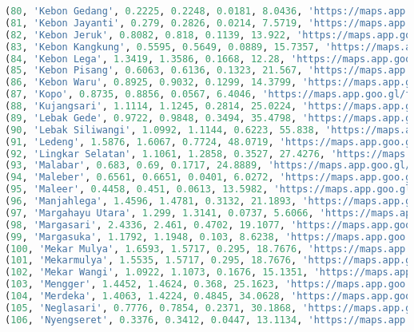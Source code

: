 \begin{lstlisting}[language=SQL]
(80, 'Kebon Gedang', 0.2225, 0.2248, 0.0181, 8.0436, 'https://maps.app.goo.gl/T7Pp2V7doJ4uaTRy8'),
(81, 'Kebon Jayanti', 0.279, 0.2826, 0.0214, 7.5719, 'https://maps.app.goo.gl/KCw53NEcF9yq2qxGA'),
(82, 'Kebon Jeruk', 0.8082, 0.818, 0.1139, 13.922, 'https://maps.app.goo.gl/nn4zm4juMAaCpMEn7'),
(83, 'Kebon Kangkung', 0.5595, 0.5649, 0.0889, 15.7357, 'https://maps.app.goo.gl/TFQZojC3aJFHotxr7'),
(84, 'Kebon Lega', 1.3419, 1.3586, 0.1668, 12.28, 'https://maps.app.goo.gl/oNBmV2wdeuiK2jAL9'),
(85, 'Kebon Pisang', 0.6063, 0.6136, 0.1323, 21.567, 'https://maps.app.goo.gl/nvx8rJGck5E8mMjUA'),
(86, 'Kebon Waru', 0.8925, 0.9032, 0.1299, 14.3799, 'https://maps.app.goo.gl/n9EkDgcQz7Xy5E599'),
(87, 'Kopo', 0.8735, 0.8856, 0.0567, 6.4046, 'https://maps.app.goo.gl/fP8WmgbTW8GKpzW6A'),
(88, 'Kujangsari', 1.1114, 1.1245, 0.2814, 25.0224, 'https://maps.app.goo.gl/y5QFj8kbNrtQqFUM6'),
(89, 'Lebak Gede', 0.9722, 0.9848, 0.3494, 35.4798, 'https://maps.app.goo.gl/rueZbwVUPT4JTsoY6'),
(90, 'Lebak Siliwangi', 1.0992, 1.1144, 0.6223, 55.838, 'https://maps.app.goo.gl/AGdn5PXbSb1Lk8Ar6'),
(91, 'Ledeng', 1.5876, 1.6067, 0.7724, 48.0719, 'https://maps.app.goo.gl/NVPkfJx5te4TDS3g7'),
(92, 'Lingkar Selatan', 1.1061, 1.2858, 0.3527, 27.4276, 'https://maps.app.goo.gl/Ldx7VMExy5m8PRC76'),
(93, 'Malabar', 0.683, 0.69, 0.1717, 24.8889, 'https://maps.app.goo.gl/4dcW5rCncJnPyqGt6'),
(94, 'Maleber', 0.6561, 0.6651, 0.0401, 6.0272, 'https://maps.app.goo.gl/RD5tsGj4FiSAqc476'),
(95, 'Maleer', 0.4458, 0.451, 0.0613, 13.5982, 'https://maps.app.goo.gl/8fuCfzLL7Xf55jpS8'),
(96, 'Manjahlega', 1.4596, 1.4781, 0.3132, 21.1893, 'https://maps.app.goo.gl/9M3WgBbEajwTRHE77'),
(97, 'Margahayu Utara', 1.299, 1.3141, 0.0737, 5.6066, 'https://maps.app.goo.gl/gDNfitdRvotmu9Ny8'),
(98, 'Margasari', 2.4336, 2.461, 0.4702, 19.1077, 'https://maps.app.goo.gl/VcNjN6o8Ncx4fJip9'),
(99, 'Margasuka', 1.1792, 1.1948, 0.103, 8.6238, 'https://maps.app.goo.gl/rXKZ9JDbzcN1Z8ES8'),
(100, 'Mekar Mulya', 1.6593, 1.5717, 0.295, 18.7676, 'https://maps.app.goo.gl/a4pmEcCgnjexHDZt8'),
(101, 'Mekarmulya', 1.5535, 1.5717, 0.295, 18.7676, 'https://maps.app.goo.gl/P3ULyM6TnSUPQGgx8'),
(102, 'Mekar Wangi', 1.0922, 1.1073, 0.1676, 15.1351, 'https://maps.app.goo.gl/UrNdRcNn4ve8eoZv5'),
(103, 'Mengger', 1.4452, 1.4624, 0.368, 25.1623, 'https://maps.app.goo.gl/nKKUL5p4AdZnuVQv7'),
(104, 'Merdeka', 1.4063, 1.4224, 0.4845, 34.0628, 'https://maps.app.goo.gl/xv9qW9MC5f33AyJ99'),
(105, 'Neglasari', 0.7776, 0.7854, 0.2371, 30.1868, 'https://maps.app.goo.gl/ajAKY8pcU2f4ucV28'),
(106, 'Nyengseret', 0.3376, 0.3412, 0.0447, 13.1134, 'https://maps.app.goo.gl/cmk9TwWK2hentPm28'),

\end{lstlisting}
